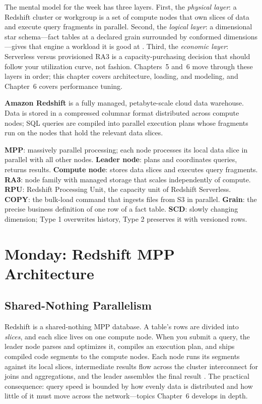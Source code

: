 The mental model for the week has three layers. First, the \emph{physical layer}: a Redshift cluster or workgroup is a set of compute nodes that own slices of data and execute query fragments in parallel. Second, the \emph{logical layer}: a dimensional star schema---fact tables at a declared grain surrounded by conformed dimensions---gives that engine a workload it is good at \cite{kimballDWToolkit}. Third, the \emph{economic layer}: Serverless versus provisioned RA3 is a capacity-purchasing decision that should follow your utilization curve, not fashion. Chapters~5 and~6 move through these layers in order; this chapter covers architecture, loading, and modeling, and Chapter~6 covers performance tuning.

\begin{definitionbox}
\textbf{Amazon Redshift} is a fully managed, petabyte-scale cloud data warehouse. Data is stored in a compressed columnar format distributed across compute nodes; SQL queries are compiled into parallel execution plans whose fragments run on the nodes that hold the relevant data slices.
\end{definitionbox}

\begin{keyterms}
\textbf{MPP}: massively parallel processing; each node processes its local data slice in parallel with all other nodes. \textbf{Leader node}: plans and coordinates queries, returns results. \textbf{Compute node}: stores data slices and executes query fragments. \textbf{RA3}: node family with managed storage that scales independently of compute. \textbf{RPU}: Redshift Processing Unit, the capacity unit of Redshift Serverless. \textbf{COPY}: the bulk-load command that ingests files from S3 in parallel. \textbf{Grain}: the precise business definition of one row of a fact table. \textbf{SCD}: slowly changing dimension; Type 1 overwrites history, Type 2 preserves it with versioned rows.
\end{keyterms}

\section{Monday: Redshift MPP Architecture}
\subsection{Shared-Nothing Parallelism}
Redshift is a shared-nothing MPP database. A table's rows are divided into \emph{slices}, and each slice lives on one compute node. When you submit a query, the leader node parses and optimizes it, compiles an execution plan, and ships compiled code segments to the compute nodes. Each node runs its segments against its local slices, intermediate results flow across the cluster interconnect for joins and aggregations, and the leader assembles the final result \cite{awsRedshiftDocs}. The practical consequence: query speed is bounded by how evenly data is distributed and how little of it must move across the network---topics Chapter~6 develops in depth.

